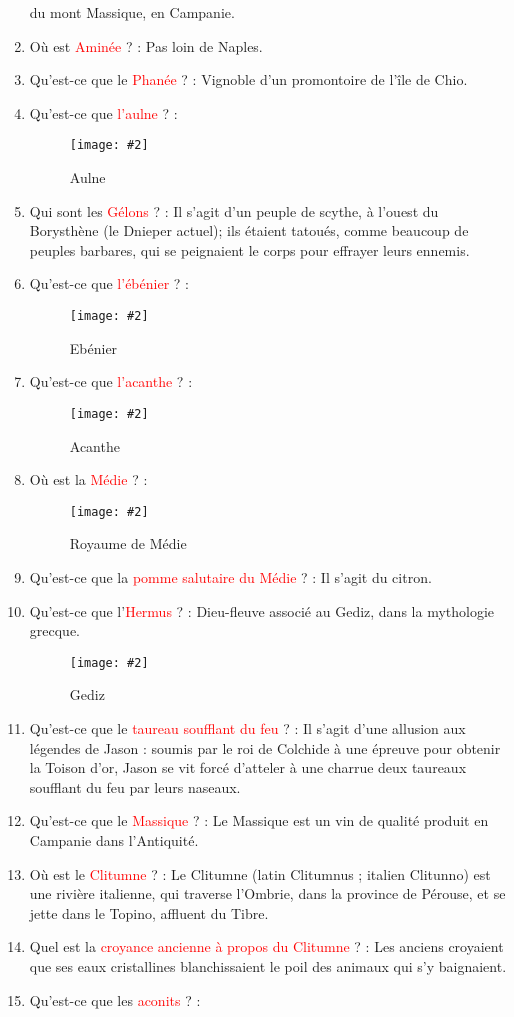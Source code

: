 \documentclass[a4paper, 11pt, hidelinks]{article}
\newcommand{\img}[4]{\begin{figure}[!ht]
    \centering
    \texttt{[image: \#2]}
    \caption{#3}
    \label{#4}
    \end{figure} }
\begin{document}
\begin{enumerate}
                  du mont Massique, en Campanie.
            \item Où est \textcolor{red}{Aminée} ? : Pas loin de Naples.
            \item Qu'est-ce que le \textcolor{red}{Phanée} ? : Vignoble d'un promontoire de l'île de Chio.
            \item Qu'est-ce que \textcolor{red}{l'aulne} ? :
            \img{0.5}{Aulne.jpg}{Aulne}{70}
            \item Qui sont les \textcolor{red}{Gélons} ? : Il s'agit d'un peuple de scythe, à l'ouest du Borysthène (le Dnieper actuel); ils étaient tatoués,
            comme beaucoup de peuples barbares, qui se peignaient le corps pour effrayer leurs ennemis.
            \item Qu'est-ce que \textcolor{red}{l'ébénier} ? :
            \img{0.5}{Ebenier.jpg}{Ebénier}{72}
      \item Qu'est-ce que \textcolor{red}{l'acanthe} ? :
            \img{0.4}{Acanthe.jpg}{Acanthe}{73}
            \item Où est la \textcolor{red}{Médie} ? :
            \img{0.4}{Medie.png}{Royaume de Médie}{74}
      \item Qu'est-ce que la \textcolor{red}{pomme salutaire du Médie} ? : Il s'agit du citron.
      \item Qu'est-ce que l'\textcolor{red}{Hermus} ? : Dieu-fleuve associé au Gediz, dans la mythologie grecque.
            \img{1}{Gediz.png}{Gediz}{76}
            \item Qu'est-ce que le \textcolor{red}{taureau soufflant du feu} ? : Il s'agit d'une allusion aux légendes de Jason : soumis par le roi de Colchide à
            une épreuve pour obtenir la Toison d'or, Jason se vit forcé d'atteler à une charrue deux taureaux soufflant du feu par leurs naseaux.
      \item Qu'est-ce que le \textcolor{red}{Massique} ? : Le Massique est un vin de qualité produit en Campanie dans l'Antiquité.
      \item Où est le \textcolor{red}{Clitumne} ? : Le Clitumne (latin Clitumnus ; italien Clitunno) est une rivière italienne, qui traverse
            l'Ombrie, dans la province de Pérouse, et se jette dans le Topino, affluent du Tibre.
      \item Quel est la \textcolor{red}{croyance ancienne à propos du Clitumne} ? : Les anciens croyaient que ses eaux cristallines blanchissaient
            le poil des animaux qui s'y baignaient.
      \item Qu'est-ce que les \textcolor{red}{aconits} ? :

\end{enumerate}
\end{document}
